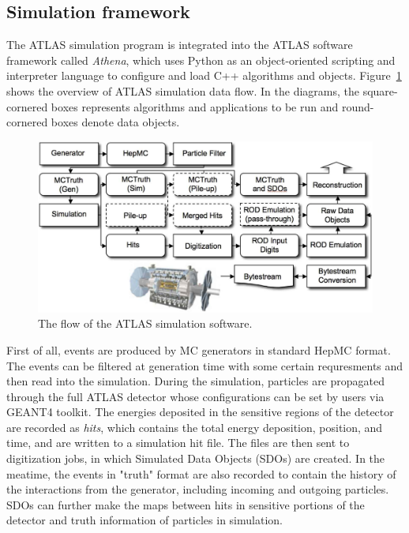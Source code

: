 \subsection{Simulation framework}

The ATLAS simulation program is integrated into the ATLAS software framework called \textit{Athena}\cite{atlas:athena},
which uses Python as an object-oriented scripting and interpreter language to configure and load C++ algorithms and objects.
Figure~\ref{fig:frame_overview} shows the overview of ATLAS simulation data flow\cite{Aad:2010ah}.
In the diagrams, the square-cornered boxes represents algorithms and applications to be run and round-cornered boxes denote data objects.
\begin{figure}[!htb]
  \centering
  \includegraphics[width=1.0\textwidth]{figures/Simulation/outline_atalsSimulation_v2.png}
  \caption{The flow of the ATLAS simulation software.}
  \label{fig:frame_overview}
\end{figure}

First of all, events are produced by MC generators in standard HepMC format.
The events can be filtered at generation time with some certain requresments and then read into the simulation.
During the simulation, particles are propagated through the full ATLAS detector whose configurations can be set by users via GEANT4 toolkit.
The energies deposited in the sensitive regions of the detector are recorded as \textit{hits}, which contains the total energy deposition,
position, and time, and are written to a simulation hit file.
The files are then sent to digitization jobs, in which Simulated Data Objects (SDOs) are created.
In the meatime, the events in "truth" format are also recorded to contain the history of the interactions from the generator, including incoming and outgoing particles.
SDOs can further make the maps between hits in sensitive portions of the detector and truth information of particles in simulation.


